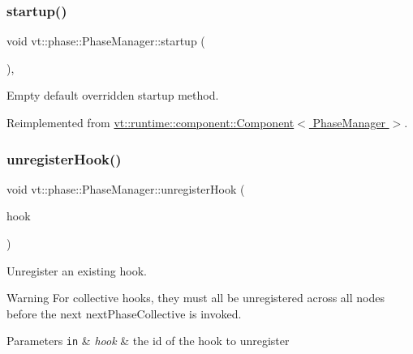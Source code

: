 \subsubsection{\texorpdfstring{startup()}{startup()}}
{\footnotesize\ttfamily void vt\+::phase\+::\+Phase\+Manager\+::startup (\begin{DoxyParamCaption}{ }\end{DoxyParamCaption})\hspace{0.3cm}{\ttfamily [override]}, {\ttfamily [virtual]}}



Empty default overridden startup method. 



Reimplemented from \hyperlink{structvt_1_1runtime_1_1component_1_1_component_aad3974307ab3b2e1df389a91310f68c2}{vt\+::runtime\+::component\+::\+Component$<$ Phase\+Manager $>$}.

\mbox{\label{structvt_1_1phase_1_1_phase_manager_a78334fd49c35f694f1e5fe5c560dc211}} 
\subsubsection{\texorpdfstring{unregister\+Hook()}{unregisterHook()}}
{\footnotesize\ttfamily void vt\+::phase\+::\+Phase\+Manager\+::unregister\+Hook (\begin{DoxyParamCaption}\item[{\hyperlink{structvt_1_1phase_1_1_phase_hook_i_d}{Phase\+Hook\+ID}}]{hook }\end{DoxyParamCaption})}



Unregister an existing hook. 

\begin{DoxyWarning}{Warning}
For collective hooks, they must all be unregistered across all nodes before the next {\ttfamily next\+Phase\+Collective} is invoked.
\end{DoxyWarning}

\begin{DoxyParams}[1]{Parameters}
\mbox{\tt in}  & {\em hook} & the id of the hook to unregister \\
\hline
\end{DoxyParams}


